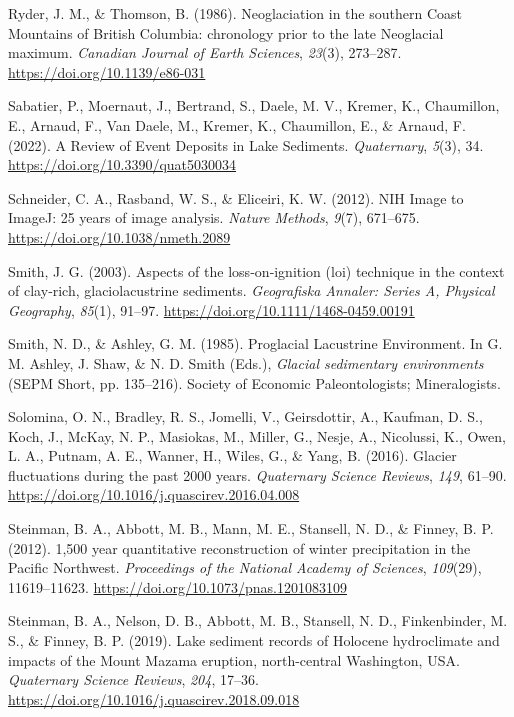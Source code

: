 \documentclass[
  letterpaper,
  DIV=11,
  numbers=noendperiod]{scrartcl}
\newlength{\cslhangindent}
\newenvironment{CSLReferences}[2] %
 {\begin{list}{}{%
  \setlength{\itemindent}{0pt}
  \setlength{\leftmargin}{0pt}
  \setlength{\parsep}{0pt}
  \ifodd #1
   \setlength{\leftmargin}{\cslhangindent}
   \setlength{\itemindent}{-1\cslhangindent}
  \fi
  \setlength{\itemsep}{#2\baselineskip}}}
 {\end{list}}
\begin{document}
\begin{CSLReferences}{1}{0}
Ryder, J. M., \& Thomson, B. (1986). {Neoglaciation in the southern
Coast Mountains of British Columbia: chronology prior to the late
Neoglacial maximum}. \emph{Canadian Journal of Earth Sciences},
\emph{23}(3), 273--287. \url{https://doi.org/10.1139/e86-031}

Sabatier, P., Moernaut, J., Bertrand, S., Daele, M. V., Kremer, K.,
Chaumillon, E., Arnaud, F., Van Daele, M., Kremer, K., Chaumillon, E.,
\& Arnaud, F. (2022). {A Review of Event Deposits in Lake Sediments}.
\emph{Quaternary}, \emph{5}(3), 34.
\url{https://doi.org/10.3390/quat5030034}

Schneider, C. A., Rasband, W. S., \& Eliceiri, K. W. (2012). {NIH Image
to ImageJ: 25 years of image analysis}. \emph{Nature Methods},
\emph{9}(7), 671--675. \url{https://doi.org/10.1038/nmeth.2089}

Smith, J. G. (2003). {Aspects of the loss‐on‐ignition (loi) technique in
the context of clay‐rich, glaciolacustrine sediments}. \emph{Geografiska
Annaler: Series A, Physical Geography}, \emph{85}(1), 91--97.
\url{https://doi.org/10.1111/1468-0459.00191}

Smith, N. D., \& Ashley, G. M. (1985). {Proglacial Lacustrine
Environment}. In G. M. Ashley, J. Shaw, \& N. D. Smith (Eds.),
\emph{Glacial sedimentary environments} (SEPM Short, pp. 135--216).
Society of Economic Paleontologists; Mineralogists.

Solomina, O. N., Bradley, R. S., Jomelli, V., Geirsdottir, A., Kaufman,
D. S., Koch, J., McKay, N. P., Masiokas, M., Miller, G., Nesje, A.,
Nicolussi, K., Owen, L. A., Putnam, A. E., Wanner, H., Wiles, G., \&
Yang, B. (2016). {Glacier fluctuations during the past 2000 years}.
\emph{Quaternary Science Reviews}, \emph{149}, 61--90.
\url{https://doi.org/10.1016/j.quascirev.2016.04.008}

Steinman, B. A., Abbott, M. B., Mann, M. E., Stansell, N. D., \& Finney,
B. P. (2012). {1,500 year quantitative reconstruction of winter
precipitation in the Pacific Northwest}. \emph{Proceedings of the
National Academy of Sciences}, \emph{109}(29), 11619--11623.
\url{https://doi.org/10.1073/pnas.1201083109}

Steinman, B. A., Nelson, D. B., Abbott, M. B., Stansell, N. D.,
Finkenbinder, M. S., \& Finney, B. P. (2019). {Lake sediment records of
Holocene hydroclimate and impacts of the Mount Mazama eruption,
north-central Washington, USA}. \emph{Quaternary Science Reviews},
\emph{204}, 17--36.
\url{https://doi.org/10.1016/j.quascirev.2018.09.018}


\end{CSLReferences}
\end{document}
